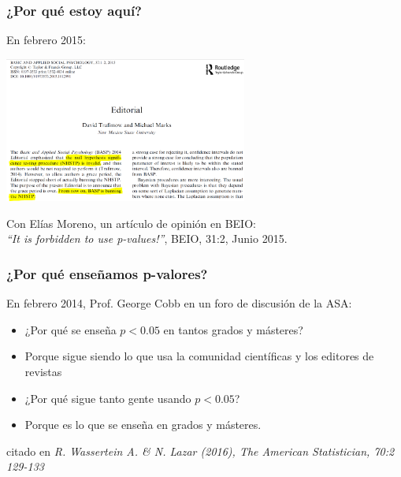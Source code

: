 \documentclass[9pt]{beamer}
\begin{document}
\begin{frame}
  \frametitle{¿Por qué estoy aquí?}
  \begin{overlayarea}{\textwidth}{\textheight}
    En febrero 2015:
    \begin{center}
      \includegraphics[width=8cm]{images/ban_editorial_2.png}
    \end{center}
    \pause
    Con Elías Moreno, un  artículo de opini\'on en BEIO:\\ 
    \textit{``It is forbidden to use p-values!''}, BEIO, 31:2, Junio
    2015.
  \end{overlayarea}
\end{frame}
\begin{frame}
  \frametitle{¿Por qué enseñamos p-valores?}

  En febrero 2014, Prof. George Cobb en un foro de discusi\'on de la
  ASA:
  \begin{block}{}
    \begin{itemize}
    \item<2-> ¿Por qué se enseña $p < 0.05$ en tantos grados y
      másteres?
    \item<3-> Porque sigue siendo lo que usa la comunidad
      científicas y los editores de revistas
    \item<4-> ¿Por qué sigue tanto gente usando  $p < 0.05$?
      
    \item<5-> Porque es lo que se enseña en grados y másteres.
    \end{itemize}
  \end{block}
      \hfill\begin{minipage}[h]{0.7\linewidth}
    {\scriptsize citado en \textit{R. Wassertein A. \&
        N. Lazar (2016), The American Statistician, 70:2 129-133}}
  \end{minipage}\bigskip
  
  \begin{center}
    \end{center}
\end{frame}
\end{document}
